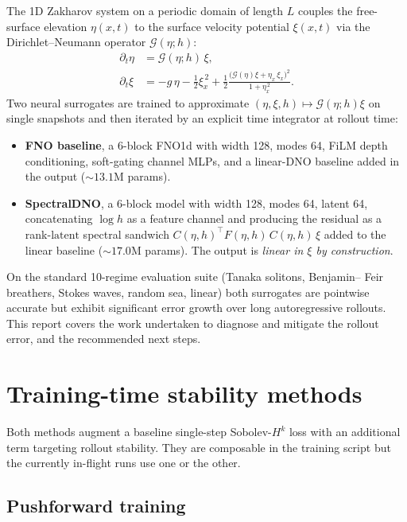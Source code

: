 \documentclass[11pt,letterpaper]{article}
\newcommand{\Gop}{\mathcal{G}}
\begin{document}
The 1D Zakharov system on a periodic domain of length $L$ couples the
free-surface elevation $\eta(x,t)$ to the surface velocity potential
$\xi(x,t)$ via the Dirichlet--Neumann operator $\Gop(\eta;h)$:
\begin{align}
\partial_t \eta &= \Gop(\eta; h)\,\xi, \\
\partial_t \xi &= -g\,\eta - \tfrac{1}{2}\xi_x^{\,2}
                 + \tfrac{1}{2}\frac{\big(\Gop(\eta)\xi + \eta_x\,\xi_x\big)^2}{1 + \eta_x^{\,2}}.
\end{align}
Two neural surrogates are trained to approximate
$(\eta,\xi,h) \mapsto \Gop(\eta;h)\xi$ on single snapshots and then
iterated by an explicit time integrator at rollout time:
\begin{itemize}[leftmargin=1.3em,itemsep=2pt]
  \item \textbf{FNO baseline}, a 6-block FNO1d with width 128, modes 64,
        FiLM depth conditioning, soft-gating channel MLPs, and a
        linear-DNO baseline added in the output ($\sim 13.1$M params).
  \item \textbf{SpectralDNO}, a 6-block model with width 128, modes 64,
        latent 64, concatenating $\log h$ as a feature channel and
        producing the residual as a rank-$\mathrm{latent}$ spectral
        sandwich $C(\eta,h)^{\!\top}\!F(\eta,h)\,C(\eta,h)\,\xi$ added
        to the linear baseline ($\sim 17.0$M params). The output is
        \emph{linear in $\xi$ by construction}.
\end{itemize}

On the standard 10-regime evaluation suite (Tanaka solitons, Benjamin--
Feir breathers, Stokes waves, random sea, linear) both surrogates are
pointwise accurate but exhibit significant error growth over long
autoregressive rollouts. This report covers the work undertaken to
diagnose and mitigate the rollout error, and the recommended next steps.

\section{Training-time stability methods}

Both methods augment a baseline single-step Sobolev-$H^k$ loss with an
additional term targeting rollout stability. They are composable in the
training script but the currently in-flight runs use one or the other.

\subsection{Pushforward training}
\label{ssec:pf}
\end{document}
